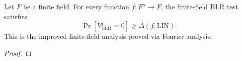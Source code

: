\begin{theorem}
\label{thm:improved-analysis-finite-fields}
\leanok
Let $F$ be a finite field. For every function
  $f : F^n \to F$, the finite-field BLR test satisfies
  \[
    \Pr[V^{f}_{\mathrm{BLR}} = 0] \ge \Delta(f,\mathrm{LIN}).
  \]
  This is the improved finite-field analysis proved via Fourier analysis.
\end{theorem}
\begin{proof}
\end{proof}
